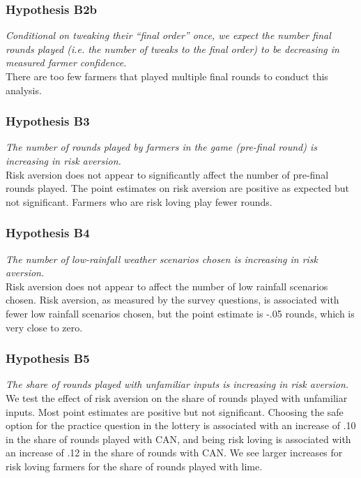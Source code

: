 \documentclass[12pt,letterpaper]{article}
\begin{document}
\subsubsection*{Hypothesis B2b}
\textit{Conditional on tweaking their “final order” once, we expect the number final rounds played (i.e. the number of tweaks to the final order) to be decreasing in measured farmer confidence. }\\
There are too few farmers that played multiple final rounds to conduct this analysis. 

\newpage
\subsubsection*{Hypothesis B3}
\textit{The number of rounds played by farmers in the game (pre-final round) is increasing in risk aversion.}\\
Risk aversion does not appear to significantly affect the number of pre-final rounds played. The point estimates on risk aversion are positive as expected but not significant. Farmers who are risk loving play fewer rounds.


\newpage
\subsubsection*{Hypothesis B4}
\textit{The number of low-rainfall weather scenarios chosen is increasing in risk aversion.}\\
Risk aversion does not appear to affect the number of low rainfall scenarios chosen. Risk aversion, as measured by the survey questions, is associated with fewer low rainfall scenarios chosen, but the point estimate is -.05 rounds, which is very close to zero. 



\newpage
\subsubsection*{Hypothesis B5}
\textit{The share of rounds played with unfamiliar inputs is increasing in risk aversion.}\\
We test the effect of risk aversion on the share of rounds played with unfamiliar inputs. Most point estimates are positive but not significant. Choosing the safe option for the practice question in the lottery is associated with an increase of .10 in the share of rounds played with CAN, and being risk loving is associated with an increase of .12 in the share of rounds with CAN. We see larger increases for risk loving farmers for the share of rounds played with lime. 
\end{document}

